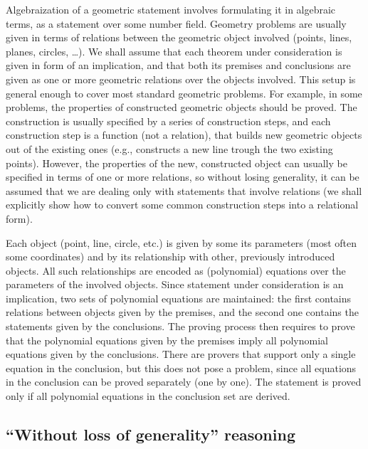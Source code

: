 \documentclass[final,1p,times,authoryear]{elsarticle}
\begin{document}
Algebraization of a geometric statement involves formulating it in
algebraic terms, as a statement over some number field. Geometry
problems are usually given in terms of relations between the geometric
object involved (points, lines, planes, circles, \ldots). We shall
assume that each theorem under consideration is given in form of an
implication, and that both its premises and conclusions are given as
one or more geometric relations over the objects involved. This setup
is general enough to cover most standard geometric problems. For
example, in some problems, the properties of constructed geometric
objects should be proved. The construction is usually specified by a
series of construction steps, and each construction step is a function
(not a relation), that builds new geometric objects out of the
existing ones (e.g., constructs a new line trough the two existing
points). However, the properties of the new, constructed object can
usually be specified in terms of one or more relations, so without
losing generality, it can be assumed that we are dealing only with
statements that involve relations (we shall explicitly show how to
convert some common construction steps into a relational form).

Each object (point, line, circle, etc.) is given by some its
parameters (most often some coordinates) and by its relationship with
other, previously introduced objects. All such relationships are
encoded as (polynomial) equations over the parameters of the involved
objects. Since statement under consideration is an implication, two
sets of polynomial equations are maintained: the first contains
relations between objects given by the premises, and the second one
contains the statements given by the conclusions. The proving process
then requires to prove that the polynomial equations given by the
premises imply all polynomial equations given by the conclusions.
There are provers that support only a single equation in the
conclusion, but this does not pose a problem, since all equations in
the conclusion can be proved separately (one by one). The statement is
proved only if all polynomial equations in the conclusion set are
derived.

\subsection{``Without loss of generality'' reasoning}
\end{document}
